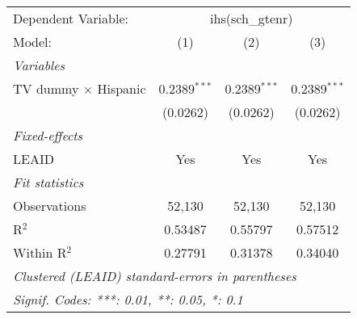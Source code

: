 \begin{tabular}{lccc}
\tabularnewline\midrule\midrule
Dependent Variable:&\multicolumn{3}{c}{ihs(sch\_gtenr)}\\
Model:&(1) & (2) & (3)\\
\midrule \emph{Variables}&   &   &  \\
TV dummy $\times$ Hispanic & 0.2389$^{***}$ & 0.2389$^{***}$ & 0.2389$^{***}$\\
  &(0.0262) & (0.0262) & (0.0262)\\
\midrule \emph{Fixed-effects}&   &   &  \\
LEAID & Yes & Yes & Yes\\
\midrule \emph{Fit statistics}&  & & \\
Observations & 52,130&52,130&52,130\\
R$^2$ & 0.53487&0.55797&0.57512\\
Within R$^2$ & 0.27791&0.31378&0.34040\\
\midrule\midrule\multicolumn{4}{l}{\emph{Clustered (LEAID) standard-errors in parentheses}}\\
\multicolumn{4}{l}{\emph{Signif. Codes: ***: 0.01, **: 0.05, *: 0.1}}\\
\end{tabular}


